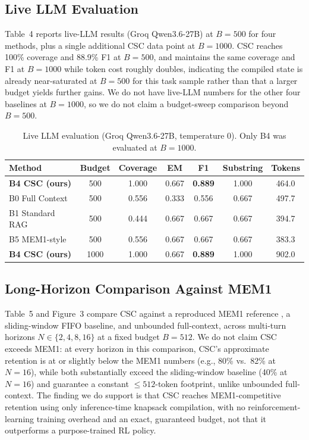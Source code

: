 \documentclass{article}
\begin{document}
\subsection{Live LLM Evaluation}

Table~4 reports live-LLM results (Groq Qwen3.6-27B) at $B=500$ for four methods, plus a single additional CSC data point at $B=1000$. CSC reaches 100\% coverage and 88.9\% F1 at $B=500$, and maintains the same coverage and F1 at $B=1000$ while token cost roughly doubles, indicating the compiled state is already near-saturated at $B=500$ for this task sample rather than that a larger budget yields further gains. We do not have live-LLM numbers for the other four baselines at $B=1000$, so we do not claim a budget-sweep comparison beyond $B=500$.

\begin{table}[t]
\caption{Live LLM evaluation (Groq Qwen3.6-27B, temperature 0). Only B4 was evaluated at $B=1000$.}
\centering
\begin{tabular}{lcccccc}
\toprule
Method & Budget & Coverage & EM & F1 & Substring & Tokens \\
\midrule
\textbf{B4 CSC (ours)} & 500 & 1.000 & 0.667 & \textbf{0.889} & 1.000 & 464.0 \\
B0 Full Context & 500 & 0.556 & 0.333 & 0.556 & 0.667 & 497.7 \\
B1 Standard RAG & 500 & 0.444 & 0.667 & 0.667 & 0.667 & 394.7 \\
B5 MEM1-style & 500 & 0.556 & 0.667 & 0.667 & 0.667 & 383.3 \\
\textbf{B4 CSC (ours)} & 1000 & 1.000 & 0.667 & \textbf{0.889} & 1.000 & 902.0 \\
\bottomrule
\end{tabular}
\end{table}

\subsection{Long-Horizon Comparison Against MEM1}

Table~5 and Figure~3 compare CSC against a reproduced MEM1 reference \citep{zhou2025mem1}, a sliding-window FIFO baseline, and unbounded full-context, across multi-turn horizons $N \in \{2,4,8,16\}$ at a fixed budget $B=512$. We do not claim CSC exceeds MEM1: at every horizon in this comparison, CSC's approximate retention is at or slightly below the MEM1 numbers (e.g., 80\% vs.\ 82\% at $N=16$), while both substantially exceed the sliding-window baseline (40\% at $N=16$) and guarantee a constant $\leq 512$-token footprint, unlike unbounded full-context. The finding we do support is that CSC reaches MEM1-competitive retention using only inference-time knapsack compilation, with no reinforcement-learning training overhead and an exact, guaranteed budget, not that it outperforms a purpose-trained RL policy.
\end{document}
